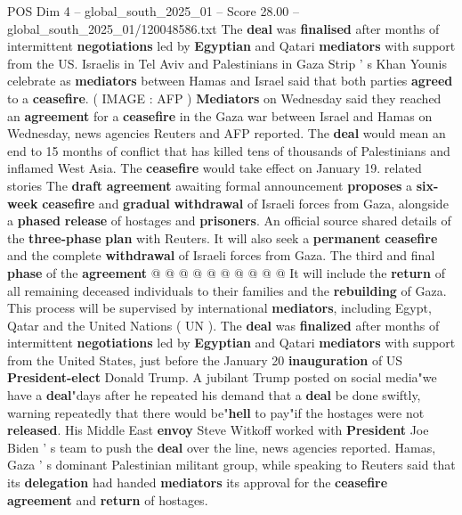 \begin{textsample}{POS Dim 4 – global\_south\_2025\_01 – Score 28.00 – global\_south\_2025\_01/120048586.txt}  \label{ex:f4_pos_005}
The \textbf{deal} was \textbf{finalised} after months of intermittent \textbf{negotiations} led by \textbf{Egyptian} and Qatari \textbf{mediators} with support from the US.
Israelis in Tel Aviv and Palestinians in Gaza Strip ' s Khan Younis celebrate as \textbf{mediators} between Hamas and Israel said that both parties \textbf{agreed} to a \textbf{ceasefire}. ( IMAGE : AFP ) \textbf{Mediators} on Wednesday said they reached an \textbf{agreement} for a \textbf{ceasefire} in the Gaza war between Israel and Hamas on Wednesday, news agencies Reuters and AFP reported.
The \textbf{deal} would mean an end to 15 months of conflict that has killed tens of thousands of Palestinians and inflamed West Asia.
The \textbf{ceasefire} would take effect on January 19. related stories The \textbf{draft} \textbf{agreement} awaiting formal announcement \textbf{proposes} a \textbf{six-week} \textbf{ceasefire} and \textbf{gradual} \textbf{withdrawal} of Israeli forces from Gaza, alongside a \textbf{phased} \textbf{release} of hostages and \textbf{prisoners}.
An official source shared details of the \textbf{three-phase} \textbf{plan} with Reuters.
It will also seek a \textbf{permanent} \textbf{ceasefire} and the complete \textbf{withdrawal} of Israeli forces from Gaza.
The third and final \textbf{phase} of the \textbf{agreement} @ @ @ @ @ @ @ @ @ @ It will include the \textbf{return} of all remaining deceased individuals to their families and the \textbf{rebuilding} of Gaza.
This process will be supervised by international \textbf{mediators}, including Egypt, Qatar and the United Nations ( UN ).
The \textbf{deal} was \textbf{finalized} after months of intermittent \textbf{negotiations} led by \textbf{Egyptian} and Qatari \textbf{mediators} with support from the United States, just before the January 20 \textbf{inauguration} of US \textbf{President-elect} Donald Trump.
A jubilant Trump posted on social media"we have a \textbf{deal}"days after he repeated his demand that a \textbf{deal} be done swiftly, warning repeatedly that there would be"\textbf{hell} to pay"if the hostages were not \textbf{released}.
His Middle East \textbf{envoy} Steve Witkoff worked with \textbf{President} Joe Biden ' s team to push the \textbf{deal} over the line, news agencies reported.
Hamas, Gaza ' s dominant Palestinian militant group, while speaking to Reuters said that its \textbf{delegation} had handed \textbf{mediators} its approval for the \textbf{ceasefire} \textbf{agreement} and \textbf{return} of hostages.

\end{textsample}
